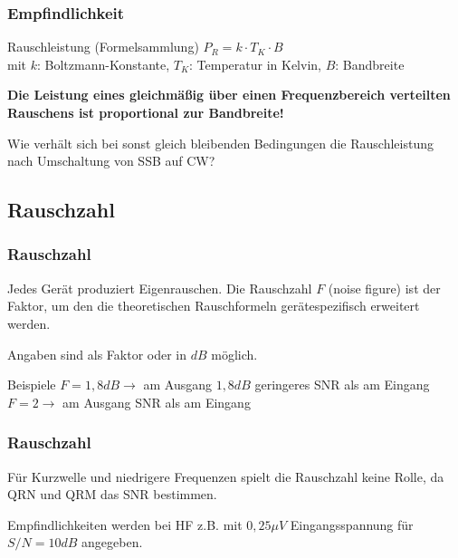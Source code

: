 \begin{frame}
    \frametitle{Empfindlichkeit}

    \begin{block}{Rauschleistung (Formelsammlung)}
      $P_R = k \cdot T_K \cdot B$\\
      mit $k$: Boltzmann-Konstante, $T_K$: Temperatur in Kelvin, $B$: Bandbreite
    \end{block}

    \bigskip

    \textbf{Die Leistung eines gleichmäßig über einen Frequenzbereich
    verteilten Rauschens ist proportional zur Bandbreite!}

    \bigskip

    \begin{exampleblock}{Wie verhält sich bei sonst gleich bleibenden Bedingungen die
                  Rauschleistung nach Umschaltung von SSB auf CW?}
    \end{exampleblock}

\end{frame}

\subsection{Rauschzahl}

\begin{frame}
    \frametitle{Rauschzahl}

    Jedes Gerät produziert Eigenrauschen. Die Rauschzahl $F$ (noise figure) ist
    der Faktor, um den die theoretischen Rauschformeln gerätespezifisch
    erweitert werden.

    \bigskip

    Angaben sind als Faktor oder in $dB$ möglich.

    \bigskip

    \begin{exampleblock}{Beispiele}
        $F=1,8 dB \rightarrow$ am Ausgang $1,8dB$ geringeres SNR als am Eingang\\
        $F=2 \rightarrow$ am Ausgang   SNR als am Eingang
    \end{exampleblock}

\end{frame}

\begin{frame}
    \frametitle{Rauschzahl}

    Für Kurzwelle und niedrigere Frequenzen spielt die Rauschzahl keine Rolle,
    da QRN und QRM das SNR bestimmen.

    \bigskip

    Empfindlichkeiten werden bei HF z.B. mit $0,25 \mu V$ Eingangsspannung für
    $S/N=10 dB$ angegeben.

\end{frame}

